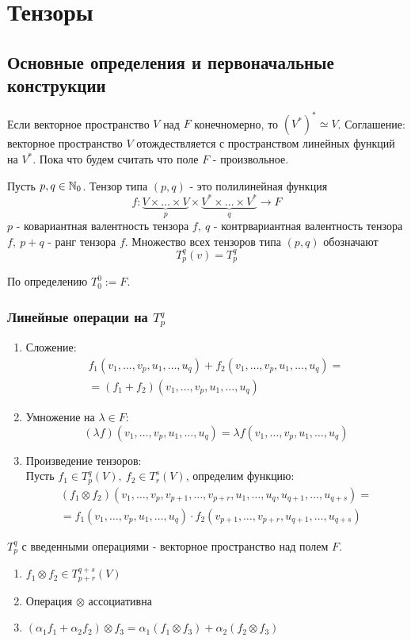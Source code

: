 \section{Тензоры}
\subsection{Основные определения и первоначальные конструкции}
Если векторное пространство $V$ над $F$ конечномерно, то $(V^*)^*\simeq V$. Соглашение: векторное пространство $V$ отождествляется с пространством линейных функций на $V^*$.
Пока что будем считать что поле $F$ - произвольное.
\begin{definition}
    Пусть $p,q\in \mathbb{N}_0$. Тензор типа $(p,q)$ - это полилинейная функция 
    \[f: \underbrace{V\times \dots\times V}_p \times \underbrace{V^*\times \dots\times V^*}_q \to F\]
    $p$ - ковариантная валентность тензора $f,\ q$ - контрвариантная валентность тензора $f,\ p+q$ - ранг тензора $f$. 
    Множество всех тензоров типа $(p,q)$ обозначают 
    \[T^q_p(v)=T^q_p\]
\end{definition} 
По определению $T_0^0 := F$.
\subsubsection*{Линейные операции на $T^q_p$}
\begin{enumerate}
    \item Сложение: 
    \begin{multline*}
        f_1(v_1,\dots,v_p,u_1,\dots,u_q)+f_2(v_1,\dots,v_p,u_1,\dots,u_q)=\\
        =(f_1+f_2)(v_1,\dots,v_p,u_1,\dots,u_q)
    \end{multline*}
    \item Умножение на $\lambda\in F$:
    \[(\lambda f)(v_1,\dots,v_p,u_1,\dots,u_q)=\lambda f(v_1,\dots,v_p,u_1,\dots,u_q)\] 
    \item Произведение тензоров:\\
    Пусть $f_1\in T_p^q(V),\ f_2\in T_r^s(V)$, определим функцию:
    \begin{multline*}
        (f_1\otimes f_2)(v_1,\dots,v_p,v_{p+1},\dots,v_{p+r},u_1,\dots,u_q,u_{q+1},\dots,u_{q+s})=\\
        =f_1(v_1,\dots,v_p,u_1,\dots,u_q)\cdot f_2(v_{p+1},\dots,v_{p+r},u_{q+1},\dots,u_{q+s})
    \end{multline*}
\end{enumerate}
\begin{subtheorem}
    $T_p^q$ с введенными операциями - векторное пространство над полем $F$.
\end{subtheorem}
\begin{subtheorem}\tab
    \begin{enumerate}
        \item $f_1\otimes f_2\in T_{p+r}^{q+s}(V)$
        \item Операция $\otimes$ ассоциативна
        \item $(\alpha_1f_1+\alpha_2f_2)\otimes f_3=\alpha_1(f_1\otimes f_3)+\alpha_2(f_2\otimes f_3)$ %
    \end{enumerate}
\end{subtheorem}
